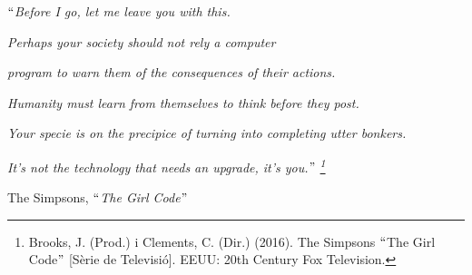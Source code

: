 \documentclass[12pt]{article}
\renewcommand{\_}{\kern-1.5pt\textunderscore\kern-1.5pt}
\begin{document}
\vspace{\baselineskip}

\vspace{\baselineskip}

\vspace{\baselineskip}

\vspace{\baselineskip}
\begin{FlushRight}
\textit{$``$Before I go, let me leave you with this. }
\end{FlushRight}\par

\begin{FlushRight}
\textit{Perhaps your society should not rely a computer }
\end{FlushRight}\par

\begin{FlushRight}
\textit{program to warn them of the consequences of their actions.}
\end{FlushRight}\par

\begin{FlushRight}
\textit{ Humanity must learn from themselves to think before they post. }
\end{FlushRight}\par

\begin{FlushRight}
\textit{Your specie is on the precipice of turning into completing utter bonkers.}
\end{FlushRight}\par

\begin{FlushRight}
\textit{It’s not the technology that needs an upgrade, it’s you.$"$ \footnote{ Brooks, J. (Prod.) i Clements, C. (Dir.) (2016). The Simpsons $``$The Girl Code$"$  [Sèrie de Televisió]. EEUU: 20th Century Fox Television. }}
\end{FlushRight}\par


\vspace{\baselineskip}
\begin{FlushRight}
{\fontsize{11pt}{13.2pt}\selectfont The Simpsons, $``$\textit{The Girl Code$"$  }\par}
\end{FlushRight}\par


\vspace{\baselineskip}
\end{document}
